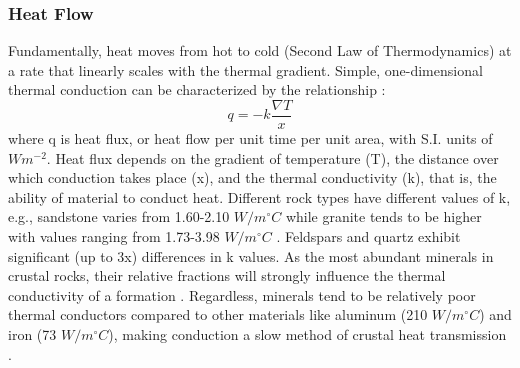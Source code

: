\subsubsection{Heat Flow}\label{ch2:heatflow}
Fundamentally, heat moves from hot to cold (Second Law of Thermodynamics) at a rate that linearly scales with the thermal gradient. Simple, one-dimensional thermal conduction can be characterized by the relationship \citep[~p. 270]{fowler_solid_2005}:
\begin{equation}\label{eq:conduction}
q = -k \frac{\nabla T}{x}
\end{equation}
where q is heat flux, or heat flow per unit time per unit area, with S.I. units of \(Wm^{-2}\). Heat flux depends on the gradient of temperature (T), the distance over which conduction takes place (x), and the thermal conductivity (k), that is, the ability of material to conduct heat. Different rock types have different values of k, e.g., sandstone varies from 1.60-2.10 \(W/m^\circ C\) while granite tends to be higher with values ranging from 1.73-3.98 \(W/m^\circ C\) \citep[~p. 30]{dipippo_geothermal_2012}. Feldspars and quartz exhibit significant (up to 3x) differences in k values. As the most abundant minerals in crustal rocks, their relative fractions will strongly influence the thermal conductivity of a formation \citep[~p. 22]{glassley_geothermal_2015}. Regardless, minerals tend to be relatively poor thermal conductors compared to other materials like aluminum (210 \(W/m^\circ C\)) and iron (73 \(W/m^\circ C\)), making conduction a slow method of crustal heat transmission \citep[~p. 23]{dipippo_geothermal_2012}.

